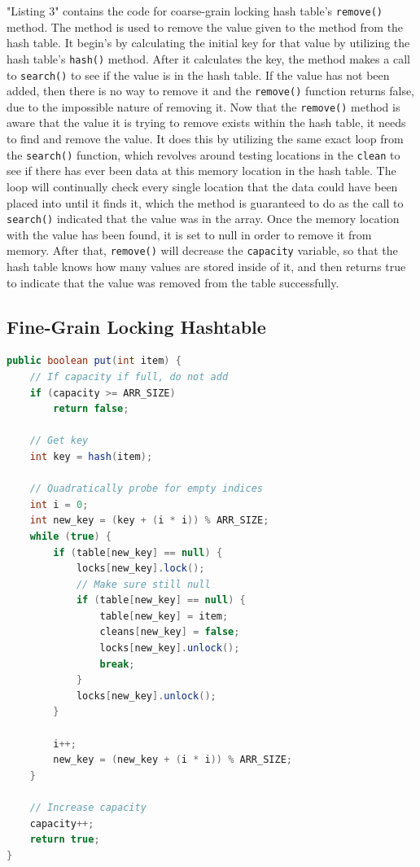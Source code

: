\documentclass[conference]{IEEEtran}
\begin{document}
"Listing 3" contains the code for coarse-grain locking hash table's \verb|remove()| method. The method is used to remove the value given to the method from the
hash table. It begin's by calculating the initial key for that value by utilizing the hash table's \verb|hash()| method. After it calculates the key, the method
makes a call to \verb|search()| to see if the value is in the hash table. If the value has not been added, then there is no way to remove it and the \verb|remove()|
function returns false, due to the impossible nature of removing it. Now that the \verb|remove()| method is aware that the value it is trying to remove
exists within the hash table, it needs to find and remove the value. It does this by utilizing the same exact loop from the \verb|search()| function, which 
revolves around testing locations in the \verb|clean| to see if there has ever been data at this memory location in the hash table. The loop will continually check
every single location that the data could have been placed into until it finds it, which the method is guaranteed to do as the call to \verb|search()| indicated
that the value was in the array. Once the memory location with the value has been found, it is set to null in order to remove it from memory. After that, \verb|remove()|
will decrease the \verb|capacity| variable, so that the hash table knows how many values are stored inside of it, and then returns true to indicate that the value
was removed from the table successfully.

\subsection{Fine-Grain Locking Hashtable}

\begin{lstlisting}[language={Java},caption=Source code for the fine-grain put() method.,captionpos=b,breaklines=true,frame=single]
public boolean put(int item) {
    // If capacity if full, do not add
    if (capacity >= ARR_SIZE)
        return false;

    // Get key
    int key = hash(item);

    // Quadratically probe for empty indices
    int i = 0;
    int new_key = (key + (i * i)) % ARR_SIZE;
    while (true) {
        if (table[new_key] == null) {
            locks[new_key].lock();
            // Make sure still null
            if (table[new_key] == null) {
                table[new_key] = item;
                cleans[new_key] = false;
                locks[new_key].unlock();
                break;
            }
            locks[new_key].unlock();
        }

        i++;
        new_key = (new_key + (i * i)) % ARR_SIZE;
    }

    // Increase capacity
    capacity++;
    return true;
}
\end{lstlisting}
\end{document}
